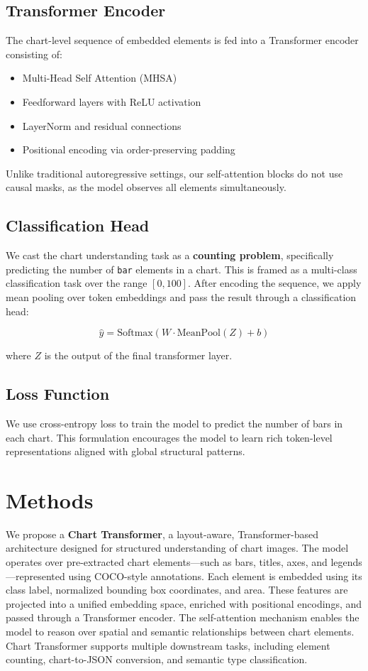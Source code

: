 \documentclass[11pt]{article}
\begin{document}
\subsection*{Transformer Encoder}

The chart-level sequence of embedded elements is fed into a Transformer encoder consisting of:
\begin{itemize}
    \item Multi-Head Self Attention (MHSA)
    \item Feedforward layers with ReLU activation
    \item LayerNorm and residual connections
    \item Positional encoding via order-preserving padding
\end{itemize}

Unlike traditional autoregressive settings, our self-attention blocks do not use causal masks, as the model observes all elements simultaneously.

\subsection*{Classification Head}

We cast the chart understanding task as a \textbf{counting problem}, specifically predicting the number of \texttt{bar} elements in a chart. This is framed as a multi-class classification task over the range $[0, 100]$. After encoding the sequence, we apply mean pooling over token embeddings and pass the result through a classification head:

\[
\hat{y} = \text{Softmax}(W \cdot \text{MeanPool}(Z) + b)
\]

where $Z$ is the output of the final transformer layer.

\subsection*{Loss Function}

We use cross-entropy loss to train the model to predict the number of bars in each chart. This formulation encourages the model to learn rich token-level representations aligned with global structural patterns.


\section{Methods}

We propose a \textbf{Chart Transformer}, a layout-aware, Transformer-based architecture designed for structured understanding of chart images. The model operates over pre-extracted chart elements—such as bars, titles, axes, and legends—represented using COCO-style annotations. Each element is embedded using its class label, normalized bounding box coordinates, and area. These features are projected into a unified embedding space, enriched with positional encodings, and passed through a Transformer encoder. The self-attention mechanism enables the model to reason over spatial and semantic relationships between chart elements. Chart Transformer supports multiple downstream tasks, including element counting, chart-to-JSON conversion, and semantic type classification.
\end{document}
